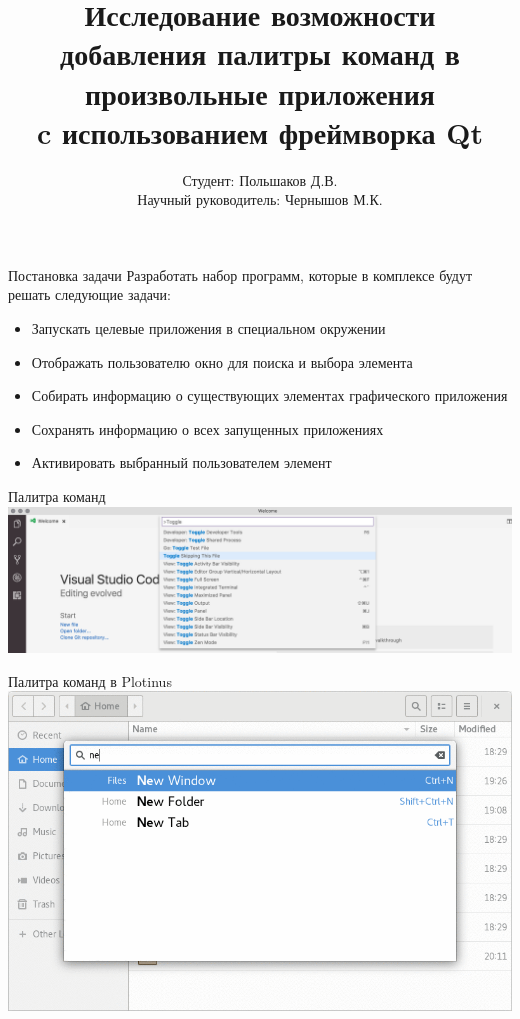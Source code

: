 \documentclass[aspectratio=1610]{beamer}
\title[Thesis]{Исследование возможности добавления палитры команд
в произвольные приложения\\c использованием фреймворка Qt}
\author{Студент: Польшаков Д.В. \\ Научный руководитель: Чернышов М.К.}
\institute{ВГУ}
\date{\the\year}
\begin{document}
	
\begin{frame}[plain]
	\titlepage
\end{frame}

\begin{frame}{Постановка задачи}
	Разработать набор программ, которые в комплексе будут решать следующие
	задачи:
	
	\begin{itemize}
		\item Запускать целевые приложения в специальном окружении
		\item Отображать пользователю окно для поиска и выбора элемента
		\item Собирать информацию о существующих элементах графического приложения
		\item Сохранять информацию о всех запущенных приложениях
		\item Активировать выбранный пользователем элемент
	\end{itemize}
\end{frame}

\begin{frame}{Палитра команд}
	\includegraphics[width=\textwidth]{vscode}
\end{frame}

\begin{frame}{Палитра команд в Plotinus}
	\centering
	\includegraphics[height=0.9\textheight]{Plotinus}
\end{frame}
\end{document}
